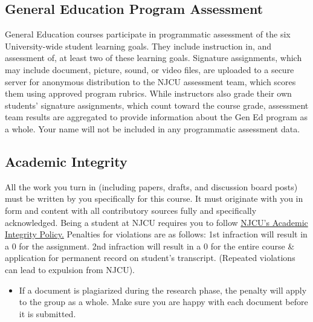 \documentclass[10pt]{article}
\begin{document}
\subsection{General Education Program Assessment} General Education courses participate in programmatic assessment of the six University-wide student learning goals. They include instruction in, and assessment of, at least two of these learning goals. Signature assignments, which may include document, picture, sound, or video files, are uploaded to a secure server for anonymous distribution to the NJCU assessment team, which scores them using approved program rubrics. While instructors also grade their own students’ signature assignments, which count toward the course grade, assessment team results are aggregated to provide information about the Gen Ed program as a whole. Your name will not be included in any programmatic assessment data.

\subsection{Academic Integrity} All the work you turn in (including papers, drafts, and discussion board posts) must be written by you specifically for this course. It must originate with you in form and content with all contributory sources fully and specifically acknowledged. Being a student at NJCU requires you to follow \href{http://www.njcu.edu/uploadedFiles/About_NJCU/Governance_and_Organization/University_Senate/Policies/Academic\%20INTEGRITY\%20POLICY\%20FINAL\%202-04.pdf}{NJCU's Academic Integrity Policy.} Penalties for violations are as follows: 1st infraction will result in a 0 for the assignment.  2nd infraction will result in a 0 for the entire course \& application for permanent record on student's transcript. (Repeated violations can lead to expulsion from NJCU). 

\begin{itemize}
\item If a document is plagiarized during the research phase, the penalty will apply to the group as a whole. Make sure you are happy with each document before it is submitted.
\end{itemize}
\end{document}
